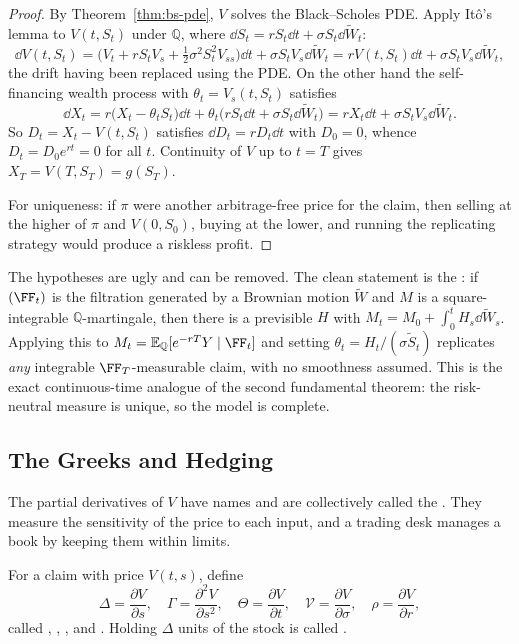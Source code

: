 \documentclass[a4paper]{scrartcl}
\newcommand{\QQ}{\mathbb{Q}}
\begin{document}
\begin{proof}
	By Theorem~\ref{thm:bs-pde}, $V$ solves the Black--Scholes PDE. Apply It\^o's lemma to $V(t,S_t)$ under $\QQ$, where $\dd S_t = rS_t\dd t + \sigma S_t\dd\tilde W_t$:
	$$
	\dd V(t,S_t) = \Big(V_t + rS_tV_s + \tfrac12\sigma^2S_t^2V_{ss}\Big)\dd t + \sigma S_tV_s\dd\tilde W_t = rV(t,S_t)\dd t + \sigma S_tV_s\dd\tilde W_t,
	$$
	the drift having been replaced using the PDE. On the other hand the self-financing wealth process with $\theta_t = V_s(t,S_t)$ satisfies
	$$
	\dd X_t = r\big(X_t - \theta_tS_t\big)\dd t + \theta_t\big(rS_t\dd t + \sigma S_t\dd\tilde W_t\big) = rX_t\dd t + \sigma S_tV_s\dd\tilde W_t.
	$$
	So $D_t = X_t - V(t,S_t)$ satisfies $\dd D_t = rD_t\dd t$ with $D_0 = 0$, whence $D_t = D_0e^{rt} = 0$ for all $t$. Continuity of $V$ up to $t=T$ gives $X_T = V(T,S_T) = g(S_T)$.

	For uniqueness: if $\pi$ were another arbitrage-free price for the claim, then selling at the higher of $\pi$ and $V(0,S_0)$, buying at the lower, and running the replicating strategy would produce a riskless profit.
\end{proof}

\begin{remark}
	The hypotheses are ugly and can be removed. The clean statement is the : if $(\FF_t)$ is the filtration generated by a Brownian motion $\tilde W$ and $M$ is a square-integrable $\QQ$-martingale, then there is a previsible $H$ with $M_t = M_0 + \int_0^tH_s\dd\tilde W_s$. Applying this to $M_t = \EE_\QQ[e^{-rT}Y\mid\FF_t]$ and setting $\theta_t = H_t/(\sigma \tilde S_t)$ replicates \emph{any} integrable $\FF_T$-measurable claim, with no smoothness assumed. This is the exact continuous-time analogue of the second fundamental theorem: the risk-neutral measure is unique, so the model is complete.
\end{remark}

\subsection{The Greeks and Hedging}

The partial derivatives of $V$ have names and are collectively called the . They measure the sensitivity of the price to each input, and a trading desk manages a book by keeping them within limits.

\begin{definition}
	For a claim with price $V(t,s)$, define
	$$
	\Delta = \frac{\partial V}{\partial s}, \quad \Gamma = \frac{\partial^2V}{\partial s^2}, \quad \Theta = \frac{\partial V}{\partial t}, \quad \mathcal{V} = \frac{\partial V}{\partial \sigma}, \quad \rho = \frac{\partial V}{\partial r},
	$$
	called , , ,  and . Holding $\Delta$ units of the stock is called .
\end{definition}
\end{document}
